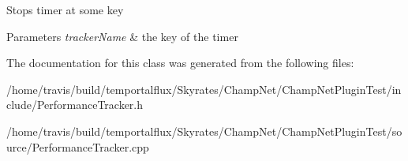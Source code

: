 Stops timer at some key 
\begin{DoxyParams}{Parameters}
{\em tracker\-Name} & the key of the timer \\
\hline
\end{DoxyParams}


The documentation for this class was generated from the following files\-:\begin{DoxyCompactItemize}
\item 
/home/travis/build/temportalflux/\-Skyrates/\-Champ\-Net/\-Champ\-Net\-Plugin\-Test/include/Performance\-Tracker.\-h\item 
/home/travis/build/temportalflux/\-Skyrates/\-Champ\-Net/\-Champ\-Net\-Plugin\-Test/source/Performance\-Tracker.\-cpp\end{DoxyCompactItemize}
